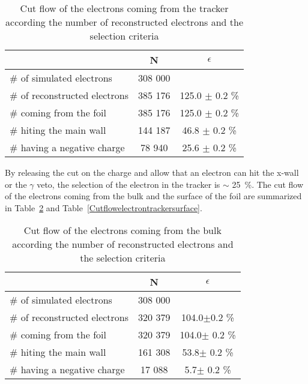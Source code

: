 \documentclass[main.tex]{subfiles}
\begin{document}
\begin{table}[h!]
\begin{center}
\begin{tabular}{l|c|c}
 & N & $\epsilon$ \\
\toprule
$\#$ of simulated electrons & 308 000 & \\
\hline
$\#$ of reconstructed electrons & 385 176 & 125.0 $\pm$ 0.2 \% \\
$\#$ coming from the foil       & 385 176 & 125.0 $\pm$ 0.2 \%\\
$\#$ hiting the main wall       & 144 187 & 46.8  $\pm$ 0.2 \%\\
$\#$ having a negative charge   & 78 940  & 25.6  $\pm$ 0.2 \%\\
\bottomrule
\end{tabular}
\end{center}
\caption{Cut flow of the electrons coming from the tracker according the number of reconstructed electrons and the selection criteria}
\label{Cutflowelectrontracker}
\end{table}


\bigskip


\noindent By releasing the cut on the charge and allow that an electron can hit the x-wall or the $\gamma$ veto, the selection of the electron in the tracker is  $\sim$ 25~\%. The cut flow of the electrons coming from the bulk and the surface of the foil are summarized in Table~\ref{Cutflowelectrontrackerbulk} and Table~\ref{Cutflowelectrontrackersurface}.


\begin{table}[h!]
\begin{center}
\begin{tabular}{l|c|c}
 & N & $\epsilon$ \\
\toprule
$\#$ of simulated electrons & 308 000 & \\
\hline
$\#$ of reconstructed electrons & 320 379 & 104.0$ \pm $0.2 \% \\
$\#$ coming from the foil       & 320 379 & 104.0$ \pm$ 0.2 \%\\
$\#$ hiting the main wall       & 161 308 & 53.8$ \pm$ 0.2 \%\\
$\#$ having a negative charge   & 17 088  & 5.7$ \pm$ 0.2 \%\\
\bottomrule
\end{tabular}
\end{center}
\caption{Cut flow of the electrons coming from the bulk according the number of reconstructed electrons and the selection criteria}
\label{Cutflowelectrontrackerbulk}
\end{table}
\end{document}
